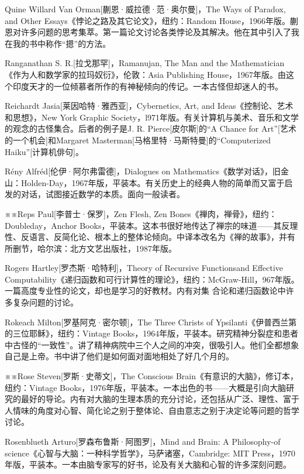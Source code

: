 \documentclass[
  12pt,
  twoside,
  openright,
  oldfontcommands,
]{memoir}
\begin{document}
Quine Willard Van Orman{[}蒯恩·威拉德·范·奥尔曼{]}，The Ways of Paradox, and Other Essays《悖论之路及其它论文》，纽约：Random House，1966年版。蒯恩对许多问题的思考集萃。第一篇论文讨论各类悖论及其解决。他在其中引入了我在我的书中称作``摁''的方法。

Ranganathan S. R.{[}拉戈那罕{]}，Ramanujan, The Man and the Mathematician《作为人和数学家的拉玛奴衍》，伦敦：Asia Publishing House，1967年版。由这个印度天才的一位倾慕者所作的有神秘倾向的传记。一本古怪但却迷人的书。

Reichardt Jasia{[}莱因哈特·雅西亚{]}，Cybernetics, Art, and Ideas《控制论、艺术和思想》，New York Graphic Society，l971年版。有关计算机与美术、音乐和文学的观念的古怪集合。后者的例子是J. R. Pierce{[}皮尔斯{]}的``A Chance for Art''{[}艺术的一个机会{]}和Margaret Masterman{[}马格里特·马斯特曼{]}的``Computerized Haiku''{[}计算机俳句{]}。

Rény Alfréd{[}伦伊·阿尔弗雷德{]}，Dialogues on Mathematics《数学对话》，旧金山：Holden-Day，1967年版，平装本。有关历史上的经典人物的简单而又富于启发的对话，试图接近数学的本质。面向一般读者。

※※Reps Paul{[}李普士·保罗{]}，Zen Flesh, Zen Bones《禅肉，禅骨》，纽约：Doubleday，Anchor Books，平装本。这本书很好地传达了禅宗的味道------其反理性、反语言、反简化论、根本上的整体论倾向。中译本改名为《禅的故事》，并有所删节，哈尔滨：北方文艺出版社，1987年版。

Rogers Hartley{[}罗杰斯·哈特利{]}，Theory of Recursive Functionsand Effective Computability《递归函数和可行计算性的理论》，纽约：McGraw-Hill，967年版。一篇高度专业性的论文，却也是学习的好教材。内有对集 合论和递归函数论中许多复杂问题的讨论。

Rokeach Milton{[}罗基阿克·密尔顿{]}，The Three Christs of Ypsilanti《伊普西兰第的三位耶稣》，纽约：Vintage Books，1964年版，平装本。研究精神分裂症和患者中古怪的``一致性''。讲了精神病院中三个人之间的冲突，很吸引人。他们全都想象自己是上帝。书中讲了他们是如何面对面地相处了好几个月的。

※※Rose Steven{[}罗斯·史蒂文{]}，The Conscious Brain《有意识的大脑》，修订本，纽约：Vintage Books，1976年版，平装本。一本出色的书------大概是引向大脑研究的最好的导论。内有对大脑的生理本质的充分讨论，还包括从广泛、理性、富于人情味的角度对心智、简化论之别于整体论、自由意志之别于决定论等问题的哲学讨论。

Rosenblueth Arturo{[}罗森布鲁斯·阿图罗{]}，Mind and Brain: A Philosophy-of science《心智与大脑：一种科学哲学》，马萨诸塞，Cambridge: MIT Press，1970年版，平装本。一本由脑专家写的好书，论及有关大脑和心智的许多深刻问题。
\end{document}
